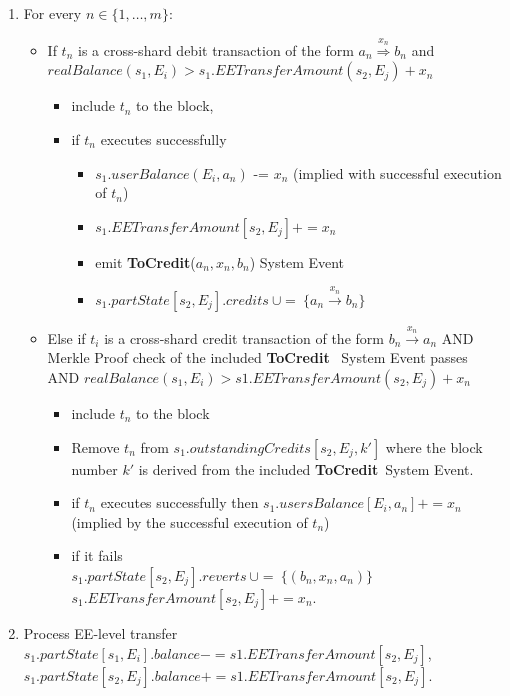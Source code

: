 \documentclass{article}
\newcommand{\tocredit}[0]{{\bf ToCredit}}
\begin{document}
\begin{enumerate}
\begin{enumerate}
	\item For every $n \in \{1, \ldots, m\}$: 
		\begin{itemize}
		\item If $t_n$ is a cross-shard debit transaction of the form $a_n \stackrel{x_n}{\Longrightarrow} b_n$ and $realBalance(s_1,E_i) > s_1.EETransferAmount(s_2,E_j) + x_n$
		\begin{itemize}
			\item include $t_n$ to the block,
			\item if $t_n$ executes successfully 
			\begin{itemize}
				\item $s_1.userBalance(E_i,a_n)$ -= $x_n$ (implied with successful execution of $t_n$)
				\item $s_1.EETransferAmount[s_2,E_j] += x_n$
				\item emit \tocredit($a_n, x_n, b_n$) System Event
				\item $s_1.partState[s_2,E_j].credits ~ \cup= ~ \{a_n \stackrel{x_n}{\longrightarrow} b_n\}$
			\end{itemize}
		\end{itemize}
		\item Else if $t_i$ is a cross-shard credit transaction of the form $b_n \stackrel{x_n}{\longrightarrow} a_n$ AND Merkle Proof check of the included \tocredit~ System Event passes AND $realBalance(s_1,E_i) > s1.EETransferAmount(s_2,E_j) + x_n$
		\begin{itemize}
			\item include $t_n$ to the block
			\item Remove $t_n$ from $s_1.outstandingCredits[s_2,E_j,k']$ where the block number $k'$ is derived from the included \tocredit ~System Event.
			\item if $t_n$ executes successfully then $s_1.usersBalance[E_i,a_n] += x_n$ (implied by the successful execution of $t_n$)
			\item if it fails \\
			$s_1.partState[s_2,E_j].reverts ~\cup=~ \{(b_n,x_n,a_n)\}$\\
			$s_1.EETransferAmount[s_2,E_j] += x_n$.
		\end{itemize}
	\end{itemize}
	\item Process EE-level transfer\\
		$s_1.partState[s_1,E_i].balance -= s1.EETransferAmount[s_2,E_j]$, \\
		$s_1.partState[s_2,E_j].balance += s1.EETransferAmount[s_2,E_j]$.
    \end{enumerate}
\end{enumerate}
\end{document}

